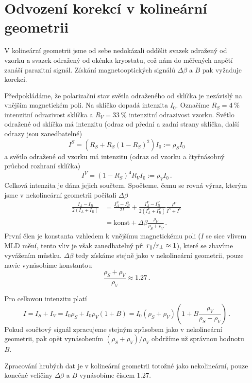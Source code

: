 \section{Odvození korekcí v kolineární geometrii}
\label{odvozeni_kolinearni}

V kolineární geometrii jsme od sebe nedokázali oddělit svazek odražený od vzorku a svazek odražený od okénka kryostatu, což nám do měřených napětí zanáší parazitní signál. Získání magnetooptických signálů $\Delta\beta$ a $B$ pak vyžaduje korekci.

Předpokládáme, že polarizační stav světla odraženého od sklíčka je nezávislý na vnějším magnetickém poli. Na sklíčko dopadá intenzita $I_0$. Označíme $R_S=\SI{4}{\percent}$ intenzitní odrazivost sklíčka a $R_V=\SI{33}{\percent}$ intenzitní odrazivost vzorku.
Světlo odražené od sklíčka má intenzitu (odraz od přední a zadní strany sklíčka, další odrazy jsou zanedbatelné)
\begin{equation}
I^S=(R_S+R_S(1-R_S)^2) I_0:=\rho_S I_0
\end{equation}
a světlo odražené od vzorku má intenzitu (odraz od vzorku a čtyřnásobný průchod rozhraní sklíčka)
\begin{equation}
I^V=(1-R_S)^4 R_V I_0 := \rho_V I_0 \,.
\end{equation}
Celková intenzita je dána jejich součtem. Spočteme, čemu se rovná výraz, kterým jsme v nekolineární geometrii počítali $\Delta\beta$
\begin{equation}
\begin{aligned}
\frac{I_A-I_B}{2(I_A+I_B)}&=\frac{I^S_A-I^S_B}{2I}+\frac{I^V_A-I^V_B}{2(I^V_A+I^V_B)}\frac{I^V}{I^S+I^V} \\
&=\text{konst}+\Delta\beta \frac{\rho_V}{\rho_S+\rho_V} \,.
\end{aligned}
\end{equation}
První člen je konstanta vzhledem k vnějšímu magnetickému poli ($I$ se sice vlivem MLD mění, tento vliv je však zanedbatelný při $r_\parallel/r_\perp\approx 1$), které se zbavíme vyvážením můstku.
$\Delta\beta$ tedy získáme stejně jako v nekolineární geometrii, pouze navíc vynásobíme konstantou
\begin{equation}
\frac{\rho_S+\rho_V}{\rho_V}\approx \num{1,27} \,.
\end{equation}

Pro celkovou intenzitu platí
\begin{equation}
I=I_S+I_V=I_0\rho_S+I_0\rho_V(1+B)=I_0(\rho_S+\rho_V)\left(1+B\frac{\rho_V}{\rho_S+\rho_V}\right) \,.
\end{equation}
Pokud součtový signál zpracujeme stejným způsobem jako v nekolineární geometrii, pak opět vynásobením $(\rho_S+\rho_V)/\rho_V$ obdržíme už správnou hodnotu $B$.

Zpracování hrubých dat je v kolineární geometrii totožné jako nekolineární, pouze konečné veličiny $\Delta\beta$ a $B$ vynásobíme číslem \num{1,27}.
